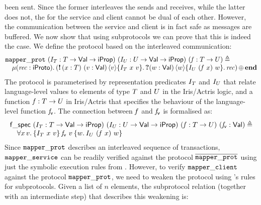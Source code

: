 been sent.
Since the former interleaves the sends and receives, while the latter does not,
the \pname for the service and client cannot be dual of each other.
However, the communication between the service and client is in fact safe as
messages are buffered.
We now show that using subprotocols we can prove that this is indeed the case.
We define the protocol based on the interleaved communication:
\[
\begin{array}{@{} l @{}}
  \mapperprotname\
  (\interpvar_\tvar : \tvar \to \Val \to \iProp)\
  (\interpvar_\tvarB : \tvarB \to \Val \to \iProp)\
  (\mapvar : \tvar \to \tvarB) \eqdef\\
  \quad
  \begin{array}{@{} l @{}}
    \MU (\recvar : \iProto).
    \selectprot
    {(
    \sendprot{(\var : \tvar)\ (\val : \Val)}
    \val
    {\interpvar_\tvar\ \var\ \val}
    \recvprot{(\valB : \Val)}{\valB}
    {\interpvar_{\tvarB}\ {(\mapvar\ \var)}\ \valB}
    \recvar)}
    {\protend}
  \end{array}
\end{array}
\]
The protocol is parameterised by representation predicates $I_T$
and $I_U$ that relate language-level values to elements of type $T$
and $U$ in the Iris/Actris logic, and a function $\mathit{f} : T \to U$
in Iris/Actris that specifies the behaviour of the language-level function $\mathit{f}_{\mathsf v}$.
The connection between $\mathit{f}$ and $\mathit{f}_{\mathsf v}$ is formalised as:
\[
\begin{array}{l}
\mapspecname\
  (\interpvar_\tvar : \tvar \to \Val \to \iProp)\
  (\interpvar_\tvarB : \tvarB \to \Val \to \iProp)\
  (\mapvar : \tvar \to \tvarB)\
  (\vmapvar : \Val) \eqdef \\
\quad\All \var\,\val.
  \hoare{\interpvar_\tvar\ \var\ \val}
  {\vmapvar\ \val}
  {\Ret \valB.
  \interpvar_\tvarB\ {(\mapvar\ \var)}\ \valB
  }
\end{array}
\]
Since $\mathtt{mapper\_prot}$ describes an interleaved sequence of transactions,
$\mathtt{mapper\_service}$ can be readily verified against the protocol
$\overline{\mathtt{mapper\_prot}}$ using just the symbolic execution rules from .
However, to verify $\mathtt{mapper\_client}$ against the protocol
$\mathtt{mapper\_prot}$, we need to weaken the protocol using \lname's rules for
subprotocols.
Given a list of $n$ elements, the subprotocol relation (together with an
intermediate step) that describes this weakening is:
